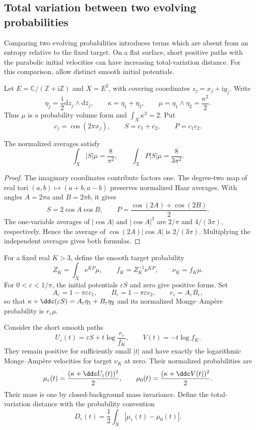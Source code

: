 \subsection{Total variation between two evolving probabilities}
\label{subsec:parabolic-total-variation-growth}

Comparing two evolving probabilities introduces terms which are absent from an entropy relative to the fixed target. On a flat surface, short positive paths with the parabolic initial velocities can have increasing total-variation distance. For this comparison, allow distinct smooth initial potentials.

Let $E=\mathbb C/(\mathbb Z+\mathrm i\mathbb Z)$ and $X=E^2$, with covering coordinates $z_j=x_j+\mathrm i y_j$. Write
\[
 \eta_j=\frac{\mathrm i}2\mathrm dz_j\wedge\mathrm d\bar z_j,
 \qquad \kappa=\eta_1+\eta_2,
 \qquad \mu=\eta_1\wedge\eta_2=\frac{\kappa^2}2.
\]
Thus $\mu$ is a probability volume form and $\int_X\kappa^2=2$. Put
\[
 c_j=\cos(2\pi x_j),\qquad S=c_1+c_2,\qquad P=c_1c_2.
\]

\begin{lemma}\label{lem:torus-total-variation-averages}
The normalized averages satisfy
\[
 \int_X|S|\mu=\frac8{\pi^2},
 \qquad \int_XP|S|\mu=\frac8{3\pi^2}.
\]
\end{lemma}
\begin{proof}
The imaginary coordinates contribute factors one. The degree-two map of real tori $(a,b)\mapsto(a+b,a-b)$ preserves normalized Haar averages. With angles $A=2\pi a$ and $B=2\pi b$, it gives
\[
 S=2\cos A\cos B,\qquad
 P=\frac{\cos(2A)+\cos(2B)}2.
\]
The one-variable averages of $|\cos A|$ and $|\cos A|^3$ are $2/\pi$ and $4/(3\pi)$, respectively. Hence the average of $\cos(2A)|\cos A|$ is $2/(3\pi)$. Multiplying the independent averages gives both formulas.
\end{proof}

For a fixed real $K>3$, define the smooth target probability
\[
 Z_K=\int_X\mathrm e^{KP}\mu,
 \qquad f_K=Z_K^{-1}\mathrm e^{KP},
 \qquad \nu_K=f_K\mu.
\]
For $0<\varepsilon<1/\pi$, the initial potentials $\varepsilon S$ and zero give positive forms. Set
\[
 A_\varepsilon=1-\pi\varepsilon c_1,
 \qquad B_\varepsilon=1-\pi\varepsilon c_2,
 \qquad r_\varepsilon=A_\varepsilon B_\varepsilon,
\]
so that $\kappa+\ddc(\varepsilon S)=A_\varepsilon\eta_1+B_\varepsilon\eta_2$ and its normalized Monge--Amp\`ere probability is $r_\varepsilon\mu$.

Consider the short smooth paths
\begin{equation}\label{eq:torus-parabolic-initial-paths}
 U_\varepsilon(t)=\varepsilon S+t\log\frac{r_\varepsilon}{f_K},
 \qquad V(t)=-t\log f_K.
\end{equation}
They remain positive for sufficiently small $|t|$ and have exactly the logarithmic Monge--Amp\`ere velocities for target $\nu_K$ at zero. Their normalized probabilities are
\[
 \mu_\varepsilon(t)=\frac{(\kappa+\ddc U_\varepsilon(t))^2}2,
 \qquad \mu_0(t)=\frac{(\kappa+\ddc V(t))^2}2.
\]
Their mass is one by closed-background mass invariance. Define the total-variation distance with the probability convention
\[
 D_\varepsilon(t)
 =\frac12\int_X|\mu_\varepsilon(t)-\mu_0(t)|.
\]

